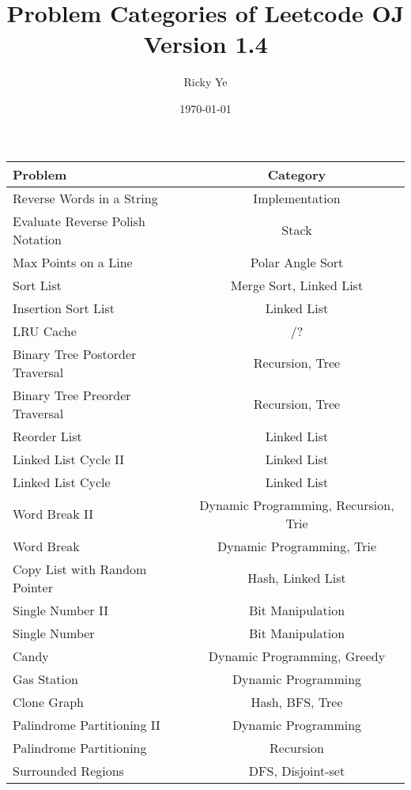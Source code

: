 \documentclass[paper=a4, fontsize=11pt]{scrartcl} %
\begin{document}
\title{Problem Categories of Leetcode OJ\\\textnormal{\small{Version 1.4}}}
\author{Ricky Ye}
\date{\today}
\maketitle

\setlength\parindent{0pt}
\small
\begin{center}
  \begin{longtable}{|l|c|}
    \hline
    \textbf{Problem}        &   \textbf{Category}    \\
    \hline
    Reverse Words in a String   &   Implementation  \\
    Evaluate Reverse Polish Notation    &   Stack   \\
    Max Points on a Line    &   Polar Angle Sort    \\
    Sort List   &   Merge Sort, Linked List \\
    Insertion Sort List &   Linked List \\
    LRU Cache   &   /?\\
    Binary Tree Postorder Traversal &   Recursion, Tree   \\
    Binary Tree Preorder Traversal  &   Recursion, Tree   \\
    Reorder List    &   Linked List \\
    Linked List Cycle II    &   Linked List \\
    Linked List Cycle   &   Linked List \\
    Word Break II   &   Dynamic Programming, Recursion, Trie\\
    Word Break  &   Dynamic Programming, Trie\\
    Copy List with Random Pointer   &   Hash, Linked List\\
    Single Number II    &   Bit Manipulation    \\
    Single Number   &   Bit Manipulation    \\
    Candy   &    Dynamic Programming, Greedy\\
    Gas Station &   Dynamic Programming \\
    Clone Graph &   Hash, BFS, Tree \\
    Palindrome Partitioning II  &   Dynamic Programming \\
    Palindrome Partitioning &   Recursion   \\
    Surrounded Regions  &   DFS, Disjoint-set    \\

\end{longtable}
\end{center}
\end{document}
